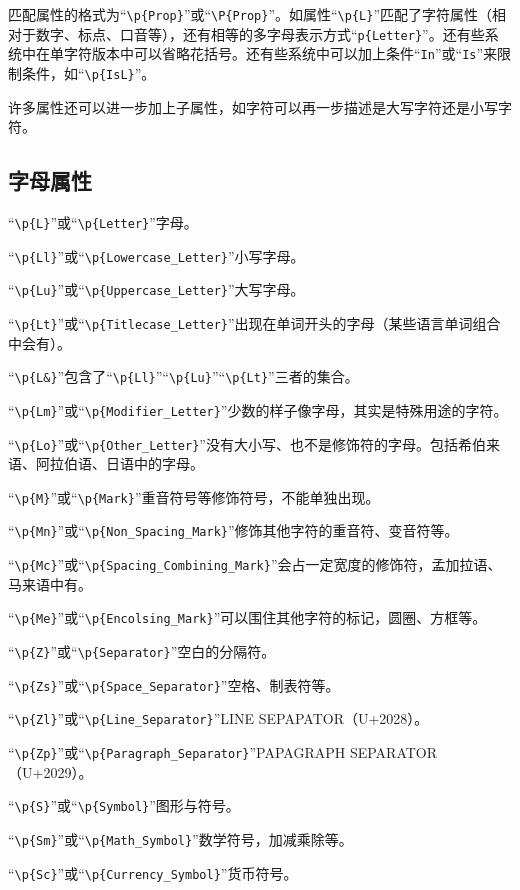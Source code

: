 匹配属性的格式为“\verb|\p{Prop}|”或“\verb|\P{Prop}|”。如属性“\verb|\p{L}|”匹配了字符属性（相对于数字、标点、口音等），还有相等的多字母表示方式“\verb|p{Letter}|”。还有些系统中在单字符版本中可以省略花括号。还有些系统中可以加上条件“\verb|In|”或“\verb|Is|”来限制条件，如“\verb|\p{IsL}|”。

许多属性还可以进一步加上子属性，如字符可以再一步描述是大写字符还是小写字符。

\subsection{字母属性}

“\verb|\p{L}|”或“\verb|\p{Letter}|”字母。

“\verb|\p{Ll}|”或“\verb|\p{Lowercase_Letter}|”小写字母。

“\verb|\p{Lu}|”或“\verb|\p{Uppercase_Letter}|”大写字母。

“\verb|\p{Lt}|”或“\verb|\p{Titlecase_Letter}|”出现在单词开头的字母（某些语言单词组合中会有）。

“\verb|\p{L&}|”包含了“\verb|\p{Ll}|”“\verb|\p{Lu}|”“\verb|\p{Lt}|”三者的集合。

“\verb|\p{Lm}|”或“\verb|\p{Modifier_Letter}|”少数的样子像字母，其实是特殊用途的字符。

“\verb|\p{Lo}|”或“\verb|\p{Other_Letter}|”没有大小写、也不是修饰符的字母。包括希伯来语、阿拉伯语、日语中的字母。

“\verb|\p{M}|”或“\verb|\p{Mark}|”重音符号等修饰符号，不能单独出现。

“\verb|\p{Mn}|”或“\verb|\p{Non_Spacing_Mark}|”修饰其他字符的重音符、变音符等。

“\verb|\p{Mc}|”或“\verb|\p{Spacing_Combining_Mark}|”会占一定宽度的修饰符，孟加拉语、马来语中有。

“\verb|\p{Me}|”或“\verb|\p{Encolsing_Mark}|”可以围住其他字符的标记，圆圈、方框等。

“\verb|\p{Z}|”或“\verb|\p{Separator}|”空白的分隔符。

“\verb|\p{Zs}|”或“\verb|\p{Space_Separator}|”空格、制表符等。

“\verb|\p{Zl}|”或“\verb|\p{Line_Separator}|”LINE SEPAPATOR（U+2028）。

“\verb|\p{Zp}|”或“\verb|\p{Paragraph_Separator}|”PAPAGRAPH SEPARATOR（U+2029）。

“\verb|\p{S}|”或“\verb|\p{Symbol}|”图形与符号。

“\verb|\p{Sm}|”或“\verb|\p{Math_Symbol}|”数学符号，加减乘除等。

“\verb|\p{Sc}|”或“\verb|\p{Currency_Symbol}|”货币符号。

